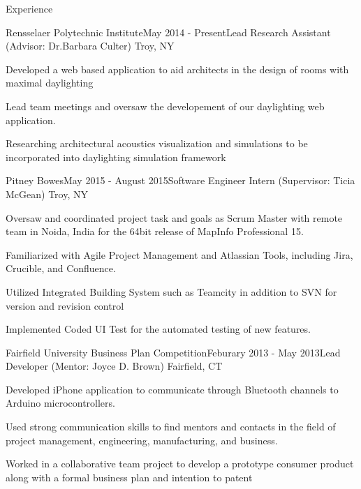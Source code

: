 \documentclass{resume} %
\begin{document}
\begin{rSection}{Experience}
\begin{rSubsection}{Rensselaer Polytechnic Institute}{May 2014 - Present}{Lead Research Assistant (Advisor: Dr.Barbara Culter) }{Troy, NY}
\item Developed a web based application to aid architects in the design of rooms with maximal daylighting
\item Lead team meetings and oversaw the developement of our daylighting web application.
\item Researching architectural acoustics visualization and simulations to be incorporated into daylighting simulation framework
\end{rSubsection}

\begin{rSubsection}{Pitney Bowes}{May 2015 - August 2015}{Software Engineer Intern (Supervisor: Ticia McGean) }{Troy, NY}
\item Oversaw and coordinated project task and goals as Scrum Master with remote team in Noida, India for the 64bit release of MapInfo Professional 15.
\item Familiarized with Agile Project Management and Atlassian Tools, including Jira, Crucible, and Confluence.
\item Utilized Integrated Building System such as Teamcity in addition to SVN for version and revision control
\item Implemented Coded UI Test for the automated testing of new features.  
\end{rSubsection}

\begin{rSubsection}{Fairfield University Business Plan Competition}{Feburary 2013 - May 2013}{Lead Developer (Mentor: Joyce D. Brown) }{Fairfield, CT}
\item Developed iPhone application to communicate through Bluetooth channels to Arduino microcontrollers.
\item Used strong communication skills to find mentors and contacts in the field of project management, engineering, manufacturing, and business.
\item Worked in a collaborative team project to develop a prototype consumer product along with a formal business plan and intention to patent
\end{rSubsection}

\end{rSection}
\end{document}
